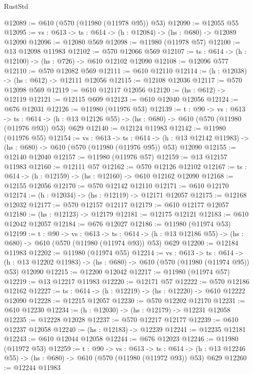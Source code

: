 \begin{lexlean}{RustStd}
\begin{coremodule}
@12089 := @610 (@570 (@11980 (@11978 @95)) @53)
@12090 := @12055 @55
@12095 := {vs : @613} -> {ts : @614} -> (h : @12084) -> (hs : @680) -> @12089 @12090
@12096 := @12080 @569
@12098 := @11980 (@11978 @57)
@12100 := @13 @12098 @11983
@12102 := @570 @12066 @569
@12107 := {ts : @614} -> (h : @12100) -> (hs : @726) -> @610 @12102 @12090
@12108 := @12096 @577
@12110 := @570 @12082 @569
@12111 := @610 @12110
@12114 := (h : @12038) -> (hs : @612) -> @12111 @12056
@12115 := @12108 @12036
@12117 := @570 @12098 @569
@12119 := @610 @12117 @12056
@12120 := (hs : @612) -> @12119
@12121 := @12115 @609
@12123 := @610 @12040 @12056
@12124 := @676 @12031
@12126 := @11980 (@11976 @53)
@12139 := {t : @90} ->
  {vs : @613} ->
  {ts : @614} -> (h : @13 @12126 @55) -> (hs : @680) -> @610 (@570 (@11980 (@11976 @93)) @53) @629
@12140 := @12124 @11983
@12142 := @11980 (@11976 @55)
@12154 := {vs : @613} ->
  {ts : @614} ->
  (h : @13 @12142 @11983) -> (hs : @680) -> @610 (@570 (@11980 (@11976 @95)) @53) @12090
@12155 := @12140 @12040
@12157 := @11980 (@11976 @57)
@12159 := @13 @12157 @11983
@12160 := @12111 @57
@12162 := @570 @12126 @12102
@12167 := {ts : @614} -> (h : @12159) -> (hs : @12160) -> @610 @12162 @12090
@12168 := @12155 @12056
@12170 := @570 @12142 @12110
@12171 := @610 @12170
@12174 := (h : @12034) -> (hs : @12119) -> @12171 @12057
@12175 := @12168 @12032
@12177 := @570 @12157 @12117
@12179 := @610 @12177 @12057
@12180 := (hs : @12123) -> @12179
@12181 := @12175 @12121
@12183 := @610 @12042 @12057
@12184 := @676 @12027
@12186 := @11980 (@11974 @53)
@12199 := {t : @90} ->
  {vs : @613} ->
  {ts : @614} -> (h : @13 @12186 @55) -> (hs : @680) -> @610 (@570 (@11980 (@11974 @93)) @53) @629
@12200 := @12184 @11983
@12202 := @11980 (@11974 @55)
@12214 := {vs : @613} ->
  {ts : @614} ->
  (h : @13 @12202 @11983) -> (hs : @680) -> @610 (@570 (@11980 (@11974 @95)) @53) @12090
@12215 := @12200 @12042
@12217 := @11980 (@11974 @57)
@12219 := @13 @12217 @11983
@12220 := @12171 @57
@12222 := @570 @12186 @12162
@12227 := {ts : @614} -> (h : @12219) -> (hs : @12220) -> @610 @12222 @12090
@12228 := @12215 @12057
@12230 := @570 @12202 @12170
@12231 := @610 @12230
@12234 := (h : @12030) -> (hs : @12179) -> @12231 @12058
@12235 := @12228 @12028
@12237 := @570 @12217 @12177
@12239 := @610 @12237 @12058
@12240 := (hs : @12183) -> @12239
@12241 := @12235 @12181
@12243 := @610 @12044 @12058
@12244 := @676 @12023
@12246 := @11980 (@11972 @53)
@12259 := {t : @90} ->
  {vs : @613} ->
  {ts : @614} -> (h : @13 @12246 @55) -> (hs : @680) -> @610 (@570 (@11980 (@11972 @93)) @53) @629
@12260 := @12244 @11983

\end{coremodule}
\end{lexlean}
